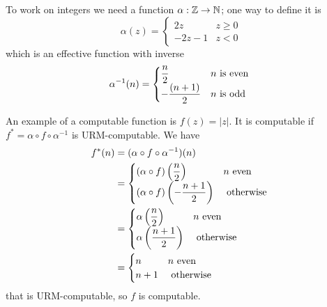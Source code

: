\begin{example}
  To work on integers we need a function $\alpha: \mathbb{Z} \rightarrow \mathbb{N}$; one way to define it is
  \begin{equation*}
    \alpha(z) = \begin{cases}
      2z    & z \geq 0 \\
      -2z-1 & z < 0
    \end{cases} 
  \end{equation*}
which is an effective function with inverse
\begin{equation*}
  \alpha^{-1}(n) = \begin{cases}
    \dfrac{n}{2}    & n $ is even $ \\
    -\dfrac{(n+1)}{2} & n $ is odd $
  \end{cases}
\end{equation*}

An example of a computable function is $f (z) =  |z| $. 
It is computable if $f^*=\alpha\circ f\circ \alpha^{-1}$ is URM-computable. We have
\begin{align*}
  f^*(n) &= (\alpha\circ f\circ \alpha^{-1})(n)\\ 
         &=  
\begin{cases}
  (\alpha\circ f)\left(\dfrac{n}{2}\right) & n $ even $ \\
  (\alpha\circ f)\left(-\dfrac{n+1}{2}\right) & $ otherwise $
\end{cases}\\
&=
\begin{cases}
  \alpha\left(\dfrac{n}{2}\right) & n $ even $\\
  \alpha\left(\dfrac{n+1}{2}\right) & $ otherwise $
\end{cases}\\
&= \begin{cases}
  n   & n $ even $ \\
  n+1 & $ otherwise $
\end{cases} 
\end{align*}
that is URM-computable, so $f$ is computable.
\end{example}
